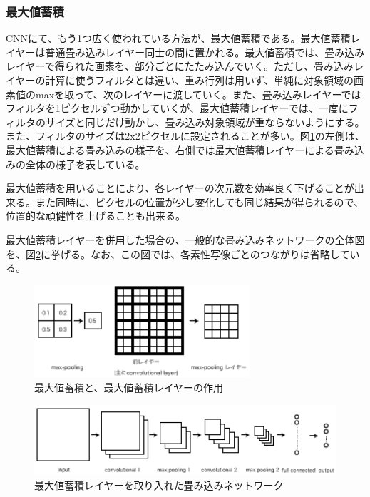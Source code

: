 \subsubsection{最大値蓄積}
CNNにて、もう1つ広く使われている方法が、最大値蓄積である。最大値蓄積レイヤーは普通畳み込みレイヤー同士の間に置かれる。最大値蓄積では、畳み込みレイヤーで得られた画素を、部分ごとにたたみ込んでいく。ただし、畳み込みレイヤーの計算に使うフィルタとは違い、重み行列は用いず、単純に対象領域の画素値のmaxを取って、次のレイヤーに渡していく。また、畳み込みレイヤーではフィルタを1ピクセルずつ動かしていくが、最大値蓄積レイヤーでは、一度にフィルタのサイズと同じだけ動かし、畳み込み対象領域が重ならないようにする。また、フィルタのサイズは2x2ピクセルに設定されることが多い。図\ref{c3_maxpooling}の左側は、最大値蓄積による畳み込みの様子を、右側では最大値蓄積レイヤーによる畳み込みの全体の様子を表している。\par
最大値蓄積を用いることにより、各レイヤーの次元数を効率良く下げることが出来る。また同時に、ピクセルの位置が少し変化しても同じ結果が得られるので、位置的な頑健性を上げることも出来る。\par
最大値蓄積レイヤーを併用した場合の、一般的な畳み込みネットワークの全体図を、図\ref{c3_convnet}に挙げる。なお、この図では、各素性写像ごとのつながりは省略している。

\begin{figure}[tbp]
 \centering
  \includegraphics[width=80mm]{img/c3/maxpooling}
 \caption{最大値蓄積と、最大値蓄積レイヤーの作用}
 \label{c3_maxpooling}
\end{figure}

\begin{figure}[tbp]
 \centering
  \includegraphics[width=120mm]{img/c3/convnet}
 \caption{最大値蓄積レイヤーを取り入れた畳み込みネットワーク}
 \label{c3_convnet}
\end{figure}

